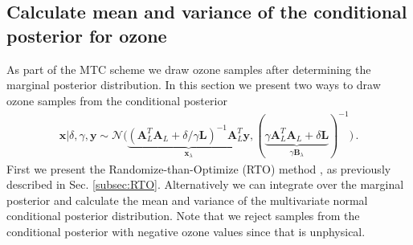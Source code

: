 \subsection{Calculate mean and variance of the conditional posterior for ozone}
\label{subsec:firstCond}
As part of the MTC scheme we draw ozone samples after determining the marginal posterior distribution.
In this section we present two ways to draw ozone samples from the conditional posterior
\begin{align}
	\bm{x}| \delta, \gamma, \bm{y}  \sim \mathcal{N}\big( \underbrace{ (\bm{A}_L^T \bm{A}_L + \delta / \gamma \bm{L} )^{-1} \bm{A}_L^T \bm{y}}_{\bm{x}_{\lambda}}, ( \underbrace{ \gamma \bm{A}_L^T \bm{A}_L + \delta \bm{L} }_{\gamma \bm{B}_{\lambda}}  )^{-1} \big) \, \label{eq:CondPost}.
\end{align}
First we present the Randomize-than-Optimize (RTO) method \cite{bardsley2012mcmc,bardsley2015randomize, fox2016fast}, as previously described in Sec. \ref{subsec:RTO}.
Alternatively we can integrate over the marginal posterior and calculate the mean and variance of the multivariate normal conditional posterior distribution.
Note that we reject samples from the conditional posterior with negative ozone values since that is unphysical.

%

